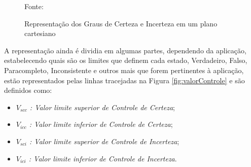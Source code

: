 %

\begin{figure}[!h]
\centering
\caption{Representação dos Graus de Certeza e Incerteza em um plano cartesiano}
\label{fig:retasgcgct}

{\small Fonte: \cite{JoaoInacio}}
\end{figure}











A representação ainda é dividia em algumas partes, dependendo da aplicação, estabelecendo quais são os limites que definem cada estado, Verdadeiro, Falso, Paracompleto, Inconsistente e outros mais que forem pertinentes à aplicação, estão representados pelas linhas tracejadas na Figura \ref{fig:valorControle} e são definidos como:

\begin{itemize}
\item \emph{$V_{scc}$ : Valor limite superior de Controle de Certeza};
\item \emph{$V_{icc}$ : Valor limite inferior de Controle de Certeza};
\item \emph{$V_{sci}$ : Valor limite superior de Controle de Incerteza};
\item \emph{$V_{ici}$ : Valor limite inferior de Controle de Incerteza}.
\end{itemize}

